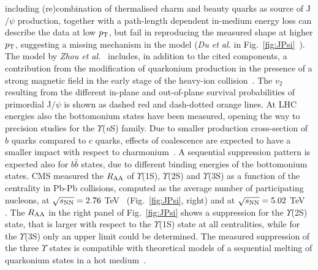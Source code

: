 including (re)combination of thermalised charm and beauty quarks as 
source of J$/\psi$ production, together with a path-length dependent in-medium 
energy loss can describe the data at low $p_{\rm T}$, but fail in 
reproducing the measured shape at higher $p_{\rm T}$, suggesting a missing mechanism in the 
model ({\it Du et al.} in Fig.~\ref{fig:JPsi}~\cite{Du:2015wha}). The model by 
{\it Zhou et al.}~\cite{Zhou:2014kka} includes, in addition to the cited components, 
a contribution from the modification of quarkonium production in the presence 
of a strong magnetic field in the early stage of the heavy-ion collision~\cite{Guo:2015nsa}. 
The $v_2$ resulting from the different in-plane and out-of-plane survival 
probabilities of primordial J$/\psi$ is shown as dashed red and dash-dotted 
orange lines. At LHC energies also the bottomonium states have been 
measured, opening the way to precision studies for the $\Upsilon$({\it n}S) 
family. Due to smaller production cross-section of $b$ quarks compared to $c$ quarks, 
effects of coalescence are
expected to have a smaller impact with respect to charmonium~\cite{Andronic:2015wma}. 
A sequential suppression pattern is expected also for $b\bar{b}$ states, due to 
different binding energies of the bottomonium states. CMS measured 
the $R_{\rm AA}$ of $\Upsilon$(1S), $\Upsilon$(2S) and $\Upsilon$(3S) as a 
function of the centrality in Pb-Pb collisions, computed as the average number of participating
nucleons, at 
$\sqrt{s_{\rm NN}} = 2.76$ TeV~\cite{Khachatryan:2016xxp} (Fig.~\ref{fig:JPsi}, right) and at 
$\sqrt{s_{\rm NN}} = 5.02$ TeV~	\cite{Sirunyan:2017lzi}. The $R_{\rm AA}$ in the right panel of Fig.~\ref{fig:JPsi} shows a 
suppression for the $\Upsilon$(2S) state, that is larger with 
respect to the $\Upsilon$(1S) state at all centralities, while for 
the $\Upsilon$(3S) only an upper limit could be determined.
The measured suppression of the three $\Upsilon$ states is compatible 
with theoretical models of a sequential melting of quarkonium states in a 
hot medium~\cite{Khachatryan:2016xxp}.
